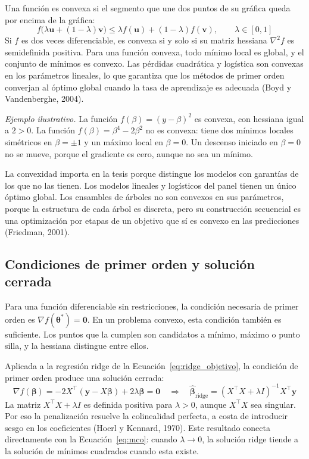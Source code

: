 Una función es convexa si el segmento que une dos puntos de su gráfica queda por encima de la gráfica:
\begin{equation}
f\big(\lambda\mathbf{u}+(1-\lambda)\mathbf{v}\big)\leq \lambda f(\mathbf{u})+(1-\lambda) f(\mathbf{v}), \qquad \lambda\in[0,1]
\label{eq:convexidad}
\end{equation}
Si $f$ es dos veces diferenciable, es convexa si y solo si su matriz hessiana $\nabla^2 f$ es semidefinida positiva. Para una función convexa, todo mínimo local es global, y el conjunto de mínimos es convexo. Las pérdidas cuadrática y logística son convexas en los parámetros lineales, lo que garantiza que los métodos de primer orden converjan al óptimo global cuando la tasa de aprendizaje es adecuada (Boyd y Vandenberghe, 2004).

\textit{Ejemplo ilustrativo.} La función $f(\beta)=(y-\beta)^2$ es convexa, con hessiana igual a $2>0$. La función $f(\beta)=\beta^4-2\beta^2$ no es convexa: tiene dos mínimos locales simétricos en $\beta=\pm 1$ y un máximo local en $\beta=0$. Un descenso iniciado en $\beta=0$ no se mueve, porque el gradiente es cero, aunque no sea un mínimo.

La convexidad importa en la tesis porque distingue los modelos con garantías de los que no las tienen. Los modelos lineales y logísticos del panel tienen un único óptimo global. Los ensambles de árboles no son convexos en sus parámetros, porque la estructura de cada árbol es discreta, pero su construcción secuencial es una optimización por etapas de un objetivo que sí es convexo en las predicciones (Friedman, 2001).

\subsection{Condiciones de primer orden y solución cerrada}
Para una función diferenciable sin restricciones, la condición necesaria de primer orden es $\nabla f(\boldsymbol{\theta}^{*})=\mathbf{0}$. En un problema convexo, esta condición también es suficiente. Los puntos que la cumplen son candidatos a mínimo, máximo o punto silla, y la hessiana distingue entre ellos.

Aplicada a la regresión ridge de la Ecuación~\eqref{eq:ridge_objetivo}, la condición de primer orden produce una solución cerrada:
\begin{equation}
\nabla f(\boldsymbol{\beta})=-2X^\top(\mathbf{y}-X\boldsymbol{\beta})+2\lambda\boldsymbol{\beta}=\mathbf{0} \quad\Longrightarrow\quad \hat{\boldsymbol{\beta}}_{\text{ridge}}=(X^\top X+\lambda I)^{-1}X^\top\mathbf{y}
\label{eq:ridge_cerrada}
\end{equation}
La matriz $X^\top X+\lambda I$ es definida positiva para $\lambda>0$, aunque $X^\top X$ sea singular. Por eso la penalización resuelve la colinealidad perfecta, a costa de introducir sesgo en los coeficientes (Hoerl y Kennard, 1970). Este resultado conecta directamente con la Ecuación~\eqref{eq:mco}: cuando $\lambda\to 0$, la solución ridge tiende a la solución de mínimos cuadrados cuando esta existe.

